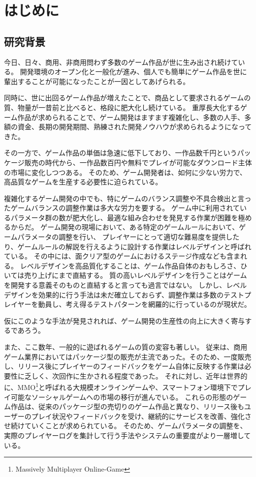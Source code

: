 \chapter{はじめに}
\section{研究背景}
今日、日々、商用、非商用問わず多数のゲーム作品が世に生み出され続けている。
開発環境のオープン化と一般化が進み、個人でも簡単にゲーム作品を世に輩出することが可能になったことが一因としてあげられる。

同時に、世に出回るゲーム作品が増えたことで、商品として要求されるゲームの質、物量が一昔前と比べると、格段に肥大化し続けている。
重厚長大化するゲーム作品が求められることで、ゲーム開発はますます複雑化し、多数の人手、多額の資金、長期の開発期間、熟練された開発ノウハウが求められるようになってきた。

その一方で、ゲーム作品の単価は急速に低下しており、一作品数千円というパッケージ販売の時代から、一作品数百円や無料でプレイが可能なダウンロード主体の市場に変化しつつある。
そのため、ゲーム開発者は、如何に少ない労力で、高品質なゲームを生産する必要性に迫られている。

複雑化するゲーム開発の中でも、特にゲームのバランス調整や不具合検出と言ったゲームバランスの調整作業は多大な労力を要する。
ゲーム中に利用されているパラメータ群の数が肥大化し、最適な組み合わせを発見する作業が困難を極めるからだ。
ゲーム開発の現場において、ある特定のゲームルールにおいて、ゲームパラメータの調整を行い、
プレイヤーにとって適切な難易度を提供したり、ゲームルールの解説を行えるように設計する作業はレベルデザインと呼ばれている。
その中には、面クリア型のゲームにおけるステージ作成なども含まれる。
レベルデザインを高品質化することは、ゲーム作品自体のおもしろさ、ひいては売り上げにまで直結する。
質の高いレベルデザインを行うことはゲームを開発する意義そのものと直結すると言っても過言ではない。
しかし、レベルデザインを効果的に行う手法は未だ確立しておらず、調整作業は多数のテストプレイヤーを動員し、考え得るテストパターンを網羅的に行っているのが現状だ。

仮にこのような手法が発見されれば、ゲーム開発の生産性の向上に大きく寄与するであろう。

また、ここ数年、一般的に遊ばれるゲームの質の変容も著しい。
従来は、商用ゲーム業界においてはパッケージ型の販売が主流であった。そのため、一度販売し、リリース後にプレイヤーのフィードバックをゲーム自体に反映する作業は必要性に乏しく、次回作に生かされる程度であった。
それに対し、近年は世界的に、MMO\footnote{Massively Multiplayer Online-Game}と呼ばれる大規模オンラインゲームや、スマートフォン環境下でプレイ可能なソーシャルゲームへの市場の移行が進んでいる。
これらの形態のゲーム作品は、従来のパッケージ型の売切りのゲーム作品と異なり、リリース後もユーザーのプレイ状況やフィードバックを受け、継続的にサービスを改善、強化させ続けていくことが求められている。
そのため、ゲームパラメータの調整を、実際のプレイヤーログを集計して行う手法やシステムの重要度がより一層増している。

